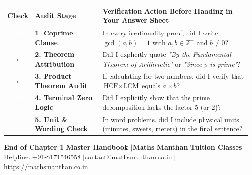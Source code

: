 \documentclass[10pt,a4paper]{article}
\begin{document}
\begin{successBox}[title=Pre-Submission Verification Checklist,fonttitle=\bfseries\color{navy}]
  {\footnotesize
  \begin{tabularx}{\textwidth}{@{}clX@{}}
    \toprule
    \textbf{Check} & \textbf{Audit Stage} & \textbf{Verification Action Before Handing in Your Answer Sheet} \\
    \midrule
    $\square$ & \textbf{1. Coprime Clause} & In every irrationality proof, did I write $\gcd(a, b) = 1$ with $a, b \in \mathbb{Z}^+$ and $b \ne 0$? \\
    \addlinespace[1pt]
    $\square$ & \textbf{2. Theorem Attribution} & Did I explicitly quote \textit{"By the Fundamental Theorem of Arithmetic"} or \textit{"Since $p$ is prime"}? \\
    \addlinespace[1pt]
    $\square$ & \textbf{3. Product Theorem Audit} & If calculating for two numbers, did I verify that $\text{HCF} \times \text{LCM}$ equals $a \times b$? \\
    \addlinespace[1pt]
    $\square$ & \textbf{4. Terminal Zero Logic} & Did I explicitly show that the prime decomposition lacks the factor $5$ (or $2$)? \\
    \addlinespace[1pt]
    $\square$ & \textbf{5. Unit \& Wording Check} & In word problems, did I include physical units (minutes, sweets, meters) in the final sentence? \\
    \bottomrule
  \end{tabularx}}
\end{successBox}

\vspace{1mm}
\begin{center}
  {\footnotesize\bfseries\color{navy}End of Chapter 1 Master Handbook \quad$\vert$\quad Maths Manthan Tuition Classes}\\[0.5mm]
  {\scriptsize\color{muted}Helpline: +91-8171546558 \quad$\vert$\quad contact@mathsmanthan.co.in \quad$\vert$\quad https://mathsmanthan.co.in}
\end{center}
\end{document}
